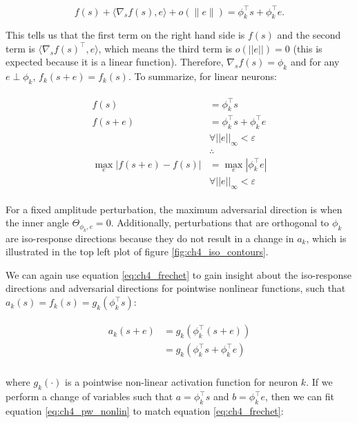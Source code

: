 \begin{equation}
    f(s) + \langle\nabla_{s}f(s), e\rangle + o(\|e\|) = \phi_{k}^\top s + \phi_{k}^\top e.
\end{equation}

This tells us that the first term on the right hand side is $f(s)$ and the second term is $\langle\nabla_{s}f(s)^\top, e\rangle$, which means the third term is $o(||e||)=0$ (this is expected because it is a linear function). Therefore,  $\nabla_{s}f(s) = \phi_{k}$ and for any $e \perp \phi_{k}$, $f_{k}(s+e) = f_{k}(s)$. To summarize, for linear neurons:

\begin{align}\label{eq:parallel_adv_proof}
\begin{split}
    f(s) &= \phi_{k}^\top s \\
    f(s+e) &= \phi_{k}^\top s + \phi_{k}^\top e \\
    &\forall ||e||_{\infty} < \varepsilon \\
    &\therefore \\
    \max_{e} | f(s+e) - f(s) | &= \max_{e} | \phi_{k}^\top e | \\
    & \forall ||e||_{\infty} < \varepsilon
\end{split}
\end{align}

For a fixed amplitude perturbation, the maximum adversarial direction is when the inner angle $\Theta_{\phi_{k},e} = 0$. Additionally, perturbations that are orthogonal to $\phi_{k}$ are iso-response directions because they do not result in a change in $a_{k}$, which is illustrated in the top left plot of figure \ref{fig:ch4_iso_contours}.

We can again use equation \ref{eq:ch4_frechet} to gain insight about the iso-response directions and adversarial directions for pointwise nonlinear functions, such that $a_{k}(s) = f_{k}(s) = g_{k}(\phi_{k}^\top s)$:

\begin{align}\label{eq:ch4_pw_nonlin}
\begin{split}
  a_{k}(s+e) &= g_{k}(\phi_{k}^\top(s+e)) \\
  &=g_{k}(\phi_{k}^\top s + \phi_{k}^\top e) \\
\end{split}
\end{align}

where $g_{k}(\cdot)$ is a pointwise non-linear activation function for neuron $k$. If we perform a change of variables such that $a = \phi_{k}^\top s$ and $b = \phi_{k}^\top e$, then we can fit equation \ref{eq:ch4_pw_nonlin} to match equation \ref{eq:ch4_frechet}:

